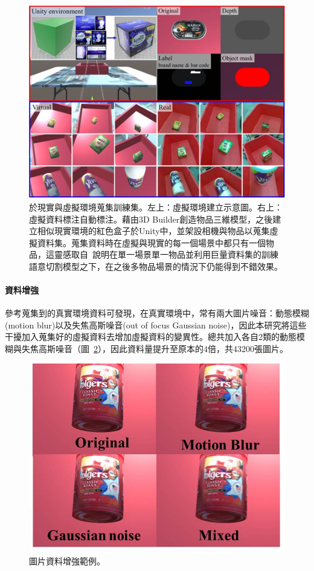 \begin{figure}[H]
	\centering
	\includegraphics[height=!, width=0.9\linewidth, keepaspectratio=true]
	{./figures/real_and_vir_environment.jpg}
  \caption{於現實與虛擬環境蒐集訓練集。左上：虛擬環境建立示意圖。右上：虛擬資料標注自動標注。藉由3D Builder創造物品三維模型，之後建立相似現實環境的紅色盒子於Unity中，並架設相機與物品以蒐集虛擬資料集。蒐集資料時在虛擬與現實的每一個場景中都只有一個物品，這靈感取自~\cite{zeng2016multi}說明在單一場景單一物品並利用巨量資料集的訓練語意切割模型之下，在之後多物品場景的情況下仍能得到不錯效果。}
  \label{figure:benchmark-dataset}
\end{figure}

\paragraph{資料增強}
參考蒐集到的真實環境資料可發現，在真實環境中，常有兩大圖片噪音：動態模糊(motion blur)以及失焦高斯噪音(out of focus Gaussian noise)，因此本研究將這些干擾加入蒐集好的虛擬資料去增加虛擬資料的變異性。總共加入各自2類的動態模糊與失焦高斯噪音（圖~\ref{figure:image_augu}），因此資料量提升至原本的4倍，共43200張圖片。

\begin{figure}[H]
	\centering
	\includegraphics[height=!, width=0.9\linewidth, keepaspectratio=true]
	{./figures/image_augu.jpg}
  \caption{圖片資料增強範例。}
  \label{figure:image_augu}
\end{figure}

